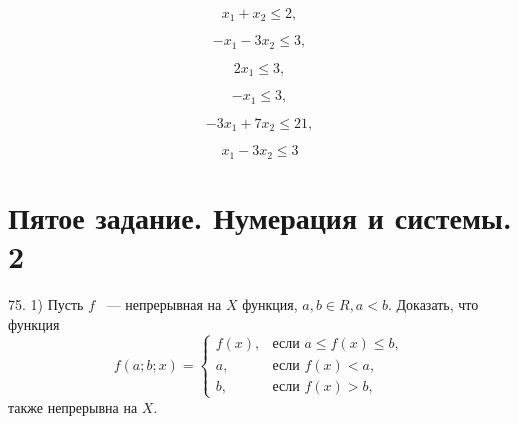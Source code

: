 \documentclass[a4paper,12pt]{article} %
\begin{document}
	\begin{equation}
		x_1 + x_2 \leqslant 2, 
	\end{equation}

	\begin{equation}
		-x_1 - 3x_2 \leqslant 3,		
	\end{equation}

	\begin{equation}
		2x_1 \leqslant 3,		
	\end{equation}

	\begin{equation}
		-x_1 \leqslant 3,
	\end{equation}

	\begin{equation}
		-3x_1 + 7x_2 \leqslant 21,		
	\end{equation}

	\begin{equation}
		x_1 - 3x_2 \leqslant 3		
	\end{equation}
	
	\newpage
	\section{Пятое задание. Нумерация и системы. 2}
	75. 1) Пусть $f$ ~--- непрерывная на $X$ функция, $a, b \in R, a < b.$ Доказать, что функция
	\[
		f(a;b;x)=\begin{cases}
			f \left(x \right), &\text{если } a \leqslant f \left(x \right) \leqslant b, \\
		a, &\text{если } f \left(x \right) < a, \\
		b, &\text{если } f \left(x \right) > b,
		\end{cases}
	\]
	также непрерывна на $X.$
	
	\newpage
\end{document}
